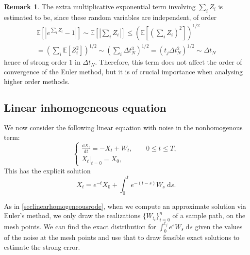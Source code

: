\documentclass[reqno,12pt]{amsart}
\theoremstyle{plain}%
\theoremstyle{definition}
\newtheorem{rmk}{Remark}[section]
\begin{document}
\begin{rmk}
The extra multiplicative exponential term involving $\sum_i Z_i$ is estimated to be, since these random variables are independent, of order 
\begin{multline*}
    \mathbb{E}\left[\left|e^{\sum_i Z_i} - 1\right|\right] \sim \mathbb{E}\left[\left|\sum_i Z_i\right|\right] \leq \left(\mathbb{E}\left[\left(\sum_i Z_i\right)^2\right]\right)^{1/2} \\
    = \left(\sum_i \mathbb{E}\left[Z_i^2\right]\right)^{1/2} \sim \left(\sum_i \Delta t_N^3 \right)^{1/2} = \left(t_j \Delta t_N^2\right)^{1/2} \sim \Delta t_N
\end{multline*}
hence of strong order 1 in $\Delta t_N$. Therefore, this term does not affect the order of convergence of the Euler method, but it is of crucial importance when analysing higher order methods.
\end{rmk}

\subsection{Linear inhomogeneous equation}


We now consider the following linear equation with noise in the nonhomogenous term:
\begin{equation}
    \label{linearnonhomogeneousrode}
    \begin{cases}
        \displaystyle \frac{\mathrm{d}X_t}{\mathrm{d} t} = -X_t + W_t, \qquad 0 \leq t \leq T, \\
        \left. X_t \right|_{t = 0} = X_0,
      \end{cases}
\end{equation}
This has the explicit solution
\begin{equation}
    X_t = e^{-t}X_0 + \int_0^t e^{-(t-s)}W_s\;\mathrm{d}s.
\end{equation}

As in \cref{seclinearhomogeneousrode}, when we compute an approximate solution via Euler's method, we only draw the realizations $\{W_{t_i}\}_{i=0}^n$ of a sample path, on the mesh points. We can find the exact distribution for $\int_0^{t_j} e^{s} W_s\;\mathrm{d}s$ given the values of the noise at the mesh points and use that to draw feasible exact solutions to estimate the strong error.
\end{document}
